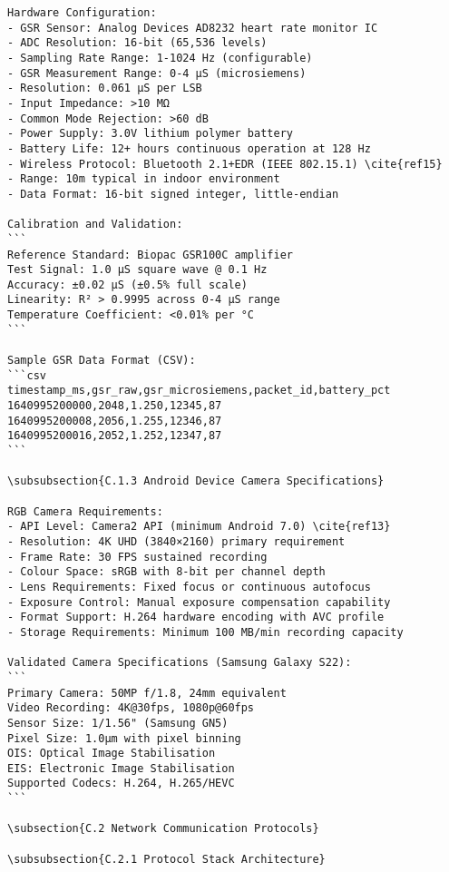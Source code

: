 \begin{verbatim}
Hardware Configuration:
- GSR Sensor: Analog Devices AD8232 heart rate monitor IC
- ADC Resolution: 16-bit (65,536 levels)
- Sampling Rate Range: 1-1024 Hz (configurable)
- GSR Measurement Range: 0-4 μS (microsiemens)
- Resolution: 0.061 μS per LSB
- Input Impedance: >10 MΩ
- Common Mode Rejection: >60 dB
- Power Supply: 3.0V lithium polymer battery
- Battery Life: 12+ hours continuous operation at 128 Hz
- Wireless Protocol: Bluetooth 2.1+EDR (IEEE 802.15.1) \cite{ref15}
- Range: 10m typical in indoor environment
- Data Format: 16-bit signed integer, little-endian

Calibration and Validation:
```
Reference Standard: Biopac GSR100C amplifier
Test Signal: 1.0 μS square wave @ 0.1 Hz
Accuracy: ±0.02 μS (±0.5% full scale)
Linearity: R² > 0.9995 across 0-4 μS range
Temperature Coefficient: <0.01% per °C
```

Sample GSR Data Format (CSV):
```csv
timestamp_ms,gsr_raw,gsr_microsiemens,packet_id,battery_pct
1640995200000,2048,1.250,12345,87
1640995200008,2056,1.255,12346,87
1640995200016,2052,1.252,12347,87
```

\subsubsection{C.1.3 Android Device Camera Specifications}

RGB Camera Requirements:
- API Level: Camera2 API (minimum Android 7.0) \cite{ref13}
- Resolution: 4K UHD (3840×2160) primary requirement
- Frame Rate: 30 FPS sustained recording
- Colour Space: sRGB with 8-bit per channel depth
- Lens Requirements: Fixed focus or continuous autofocus
- Exposure Control: Manual exposure compensation capability
- Format Support: H.264 hardware encoding with AVC profile
- Storage Requirements: Minimum 100 MB/min recording capacity

Validated Camera Specifications (Samsung Galaxy S22):
```
Primary Camera: 50MP f/1.8, 24mm equivalent
Video Recording: 4K@30fps, 1080p@60fps
Sensor Size: 1/1.56" (Samsung GN5)
Pixel Size: 1.0μm with pixel binning
OIS: Optical Image Stabilisation
EIS: Electronic Image Stabilisation
Supported Codecs: H.264, H.265/HEVC
```

\subsection{C.2 Network Communication Protocols}

\subsubsection{C.2.1 Protocol Stack Architecture}


\end{verbatim}
